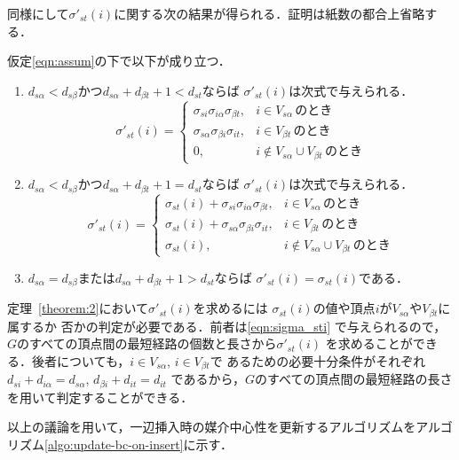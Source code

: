同様にして$\sigma'_{st}(i)$に関する次の結果が得られる．証明は紙数の都合上省略する．
\begin{theorem}
仮定\eqref{eqn:assum}の下で以下が成り立つ．
\begin{enumerate}
\item $d_{s\alpha}<d_{s\beta}$かつ$d_{s\alpha}+d_{\beta t}+1<d_{st}$ならば
$\sigma'_{st}(i)$は次式で与えられる．
\[
 \sigma'_{st}(i)=\left\{
\begin{array}{ll}
\sigma_{si}\sigma_{i\alpha}\sigma_{\beta t}, & i \in V_{s\alpha}\,\mbox{のとき} \\
\sigma_{s\alpha}\sigma_{\beta i}\sigma_{it}, & i \in V_{\beta t}\,\mbox{のとき} \\
0, & i \not\in V_{s\alpha} \cup V_{\beta t}\,\mbox{のとき}
\end{array}
\right.
\]
%
\item $d_{s\alpha}<d_{s\beta}$かつ$d_{s\alpha}+d_{\beta t}+1=d_{st}$ならば
$\sigma'_{st}(i)$は次式で与えられる．
\[
 \sigma'_{st}(i)=\left\{
\begin{array}{ll}
\sigma_{st}(i)+\sigma_{si}\sigma_{i\alpha}\sigma_{\beta t}, & i \in V_{s\alpha}\,\mbox{のとき} \\
\sigma_{st}(i)+\sigma_{s\alpha}\sigma_{\beta i}\sigma_{it}, & i \in V_{\beta t}\,\mbox{のとき} \\
\sigma_{st}(i), & i \not\in V_{s\alpha} \cup V_{\beta t}\,\mbox{のとき}
\end{array}
\right.
\]
%
\item $d_{s\alpha}=d_{s\beta}$または$d_{s\alpha}+d_{\beta t}+1>d_{st}$ならば
$\sigma'_{st}(i)=\sigma_{st}(i)$である．
\end{enumerate}
\label{theorem:2}
\end{theorem}

定理~\ref{theorem:2}において$\sigma'_{st}(i)$を求めるには
$\sigma_{st}(i)$の値や頂点$i$が$V_{s\alpha}$や$V_{\beta t}$に属するか
否かの判定が必要である．前者は\eqref{eqn:sigma_sti}
で与えられるので，$G$のすべての頂点間の最短経路の個数と長さから$\sigma'_{st}(i)$
を求めることができる．後者についても，$i \in V_{s\alpha}$, $i \in V_{\beta t}$で
あるための必要十分条件がそれぞれ$d_{si}+d_{i\alpha}=d_{s\alpha}$, 
$d_{\beta i}+d_{it}=d_{it}$
であるから，$G$のすべての頂点間の最短経路の長さを用いて判定することができる．

以上の議論を用いて，一辺挿入時の媒介中心性を更新するアルゴリズムをアルゴリズム\ref{algo:update-bc-on-insert}に示す．

